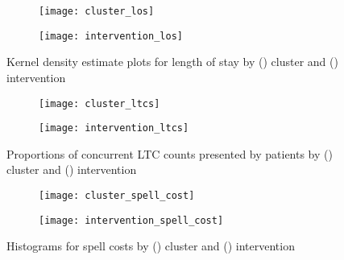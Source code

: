 \begin{figure}
    \centering
    \begin{subfigure}{\halfimgwidth}
        \texttt{[image: cluster\_los]}
        \caption{}\label{fig:cluster_los}
    \end{subfigure}\hfill%
    \begin{subfigure}{\halfimgwidth}
        \texttt{[image: intervention\_los]}
        \caption{}\label{fig:intervention_los}
    \end{subfigure}
    \caption{%
        Kernel density estimate plots for length of stay by
        () cluster and ()
        intervention
    }\label{fig:los_kde}
\end{figure}

\begin{figure}
    \centering
    \begin{subfigure}{\halfimgwidth}
        \texttt{[image: cluster\_ltcs]}
        \caption{}\label{fig:cluster_ltcs}
    \end{subfigure}\hfill%
    \begin{subfigure}{\halfimgwidth}
        \texttt{[image: intervention\_ltcs]}
        \caption{}\label{fig:intervention_ltcs}
    \end{subfigure}
    \caption{%
        Proportions of concurrent LTC counts presented by patients by
        () cluster and ()
        intervention
    }\label{fig:ltcs}
\end{figure}

\begin{figure}
    \centering
    \begin{subfigure}{\halfimgwidth}
        \texttt{[image: cluster\_spell\_cost]}
        \caption{}\label{fig:cluster_spell_cost}
    \end{subfigure}\hfill%
    \begin{subfigure}{\halfimgwidth}
        \texttt{[image: intervention\_spell\_cost]}
        \caption{}\label{fig:intervention_spell_cost}
    \end{subfigure}
    \caption{%
        Histograms for spell costs by () cluster
        and () intervention
    }\label{fig:wimd_hist}
\end{figure}

